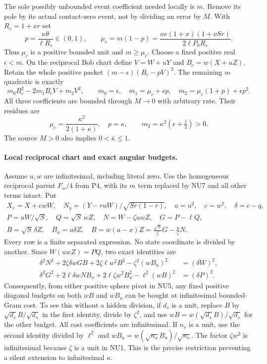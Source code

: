 The sole possibly unbounded event coefficient needed locally is
$m$. Remove its pole by its actual contact-zero event, not by
dividing an error by $M$. With $R_s=1+xr$ set
\[
 p=\frac{\kappa\theta}{\ell R_s}\in(0,1),\qquad
 \mu_c=m(1-p)=
 \frac{\kappa e(1+x)(1+\nu Sr)}{2\ell P_0R_s}.
 \tag{NU6}
\]
Thus $\mu_c$ is a positive bounded unit and $m\ge\mu_c$.
Choose a fixed positive real $\epsilon<m$. On the reciprocal
Bob chart define $V=W+uY$ and $B_c=w(X+uZ)$. Retain the whole
positive packet $(m-\epsilon)(B_c-pV)^2$. The remaining $m$
quadratic is exactly
\[
 m_0B_c^2-2m_1B_cV+m_2V^2,\qquad
 m_0=\epsilon,\quad m_1=\mu_c+\epsilon p,\quad
 m_2=\mu_c(1+p)+\epsilon p^2.
 \tag{NU7}
\]
All three coefficients are bounded through $M\to0$ with arbitrary
rate. Their residues are
\[
 \mu_c=\frac{\kappa^2}{2(1+\kappa)},\quad p=\kappa,
 \qquad m_2=\kappa^2(\epsilon+\tfrac12)>0.
 \tag{NU8}
\]
The source $M>0$ also implies $0<\bar\kappa\le1$.

\paragraph{Local reciprocal chart and exact angular budgets.}
Assume $u,w$ are infinitesimal, including literal zero. Use
the homogeneous reciprocal parent $F_w/4$ from P4, with its
$m$ term replaced by NU7 and all other terms intact. Put
\[
\begin{gathered}
 X_e=X+ewW,\quad N_y=(Y-ruW)/\sqrt{Sr(1-r)},\quad
 a=u^2,\quad c=w^2,\quad \delta=c-q,\\
 P=uW/\sqrt S,\quad Q=\sqrt S\,wZ,\quad
 N=W-\zeta uwZ,\quad G=P-\ell Q,\\
 B=\sqrt S\,\delta Z,\quad B_u=u\delta Z,\quad
 R=w(a-x)Z=\frac{\sqrt S}{\zeta}G-\frac u\zeta N.
\end{gathered}\tag{NU9}
\]
Every row is a finite separated expression. No state coordinate
is divided by another. Since $W(uwZ)=PQ$, two exact identities are
\[
\begin{split}
 \delta^2N^2+2\zeta\delta wGB+2\zeta\ell w^2B^2
                  -\zeta^2(wB_u)^2&=(\delta W)^2,\\
 \delta^2G^2+2\ell\delta wNB_u+2\ell\zeta w^2B_u^2
                  -\ell^2(wB)^2&=(\delta P)^2.
\end{split}\tag{NU10}
\]
Consequently, from either positive sphere pivot in NU5, any fixed
positive diagonal budgets on both $wB$ and $wB_u$ can be bought
at infinitesimal bounded-Gram cost. To see this without a hidden
division, if $d_s$ is a unit, replace $B$ by
$\sqrt{d_s}B/\sqrt{d_s}$ in the first identity, divide by
$\zeta^2$, and use $wB=w(\sqrt{d_s}B)/\sqrt{d_s}$ for the
other budget. All cost coefficients are infinitesimal. If $n_s$
is a unit, use the second identity divided by $\ell^2$ and
$wB_u=w(\sqrt{n_s}B_u)/\sqrt{n_s}$. The factor
$\zeta w^2$ is infinitesimal because $\zeta$ is a unit in
NU1. This is the precise restriction preventing a silent extension
to infinitesimal $\kappa$.

